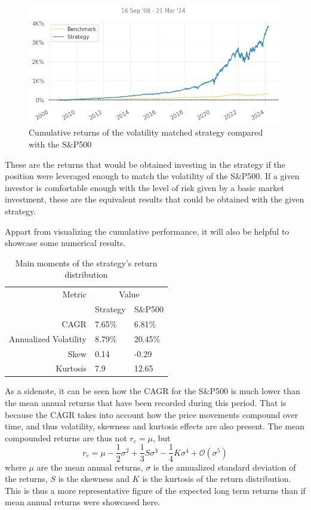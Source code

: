 \begin{figure}[ht]
    \includegraphics[width=\linewidth]{assets/strat-vs-sp500-vol-matched.png}
    \caption{Cumulative returns of the volatility matched strategy compared with the S\&P500}
    \label{fig:strat-vs-sp500-vol-matched}
\end{figure}
These are the returns that would be obtained investing in the strategy if the position were leveraged enough to match the volatility of the S\&P500. If a given investor is comfortable enough with the level of risk given by a basic market investment, these are the equivalent results that could be obtained with the given strategy.

Appart from visualizing the cumulative performance, it will also be helpful to showcase some numerical results. 

\begin{table}[ht]
    \centering
    \begin{tabular}{rll}
        \toprule
        Metric & \multicolumn{2}{c}{Value} \\ 
        \cmidrule(lr){2-3}
            & Strategy & S\&P500 \\
        \midrule
        CAGR & 7.65\% & 6.81\% \\
        Annualized Volatility & 8.79\% & 20.45\% \\
        Skew & 0.14 & -0.29 \\
        Kurtosis & 7.9 & 12.65 \\
        \bottomrule
    \end{tabular}
    \caption{Main moments of the strategy's return distribution}
    \label{table:main-moments-strat-vs-sp500}
\end{table}

As a sidenote, it can be seen how the CAGR for the S\&P500 is much lower than the mean annual returns that have been recorded during this period. That is because the CAGR takes into account how the price movements compound over time, and thus volatility, skewness and kurtosis effects are also present. The mean compounded returns are thus not $r_c=\mu$, but 
\begin{equation}
    r_c=\mu-\frac{1}{2}\sigma^2+\frac{1}{3}S\sigma^3-\frac{1}{4}K\sigma^4  + \mathcal{O}\left(\sigma^5\right)
\end{equation}
where $\mu$ are the mean annual returns, $\sigma$ is the annualized standard deviation of the returns, $S$ is the skewness and $K$ is the kurtosis of the return distribution. This is thus a more representative figure of the expected long term returns than if mean annual returns were showcased here.

